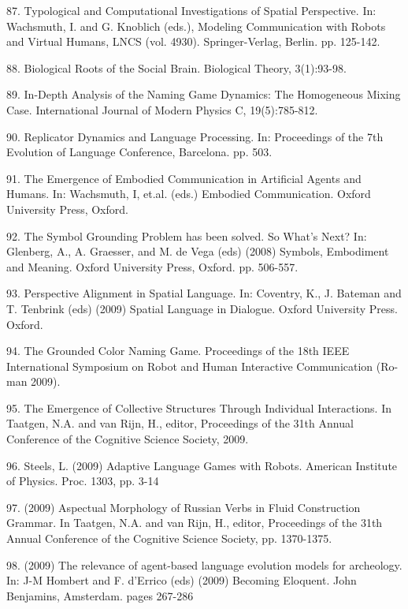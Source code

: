 87. \citet{Loetzsch:08e}  Typological and Computational Investigations of Spatial Perspective. In: Wachsmuth, I. 
and G. Knoblich (eds.), Modeling Communication with Robots and Virtual Humans, LNCS (vol. 4930). Springer-Verlag, Berlin. pp. 125-142. 

88. \citet{Steels:08f} Biological Roots of the Social Brain. Biological Theory, 3(1):93-98. 

89. \citet{Baronchelli:08g} In-Depth Analysis of the Naming Game Dynamics: The Homogeneous Mixing Case. International Journal of Modern Physics C, 19(5):785-812. 

90. \citet{Steels:08h}
Replicator Dynamics and Language Processing. In: Proceedings of the 7th Evolution of Language Conference, Barcelona. pp. 503. 

91. \citet{Galantucci:08i} The Emergence of Embodied Communication in Artificial Agents and Humans. In: Wachsmuth, I, et.al. (eds.) Embodied Communication. Oxford University Press, Oxford. 

92. \citet{Steels:08j} The Symbol Grounding Problem has been solved. So What's Next? In: Glenberg, A., A. Graesser, and M. de Vega (eds) (2008) Symbols, Embodiment and Meaning. Oxford University Press, Oxford. pp. 506-557. 

93. \citet{Steels:09a} Perspective Alignment in Spatial Language. In: Coventry, K., J. Bateman and T. Tenbrink (eds) (2009) Spatial Language in Dialogue. Oxford University Press. Oxford. 

94. \citet{Bleys:09b} The Grounded Color Naming Game. Proceedings of the 18th IEEE International Symposium on Robot and Human Interactive Communication (Ro-man 2009). 

95. \citet{Goldstone:09c} The Emergence of Collective Structures Through Individual Interactions. In Taatgen, N.A. and van Rijn, H., editor, Proceedings of the 31th Annual Conference of the Cognitive Science Society, 2009.

96. \citet{Steels:09d}
Steels, L. (2009) Adaptive Language Games with Robots. American Institute of Physics. Proc. 1303, pp. 3-14

97. \citet{Gerasymova:09e} (2009) Aspectual Morphology of Russian Verbs in Fluid Construction Grammar. In Taatgen, N.A. and van Rijn, H., editor, Proceedings of the 31th Annual Conference of the Cognitive Science Society, pp. 1370-1375. 

98. \citet{Steels:09f} (2009) The relevance of agent-based language evolution models for archeology. In: J-M Hombert and F. d'Errico (eds) (2009) Becoming Eloquent. John Benjamins, Amsterdam. pages 267-286


